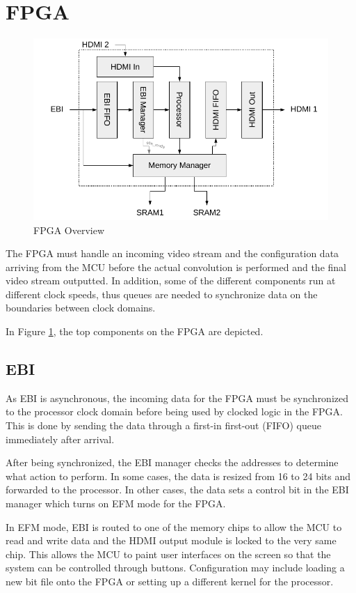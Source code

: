 \section{FPGA}
\begin{figure}
    \centering
    \includegraphics{img/FpgaOverview}
    \caption{FPGA Overview}
    \label{fig:FpgaOverview}
\end{figure}

The FPGA must handle an incoming video stream and the configuration data arriving from the MCU before the actual convolution is performed and the final video stream outputted. In addition, some of the different components run at different clock speeds, thus queues are needed to synchronize data on the boundaries between clock domains.

In Figure \ref{fig:FpgaOverview}, the top components on the FPGA are depicted.

\subsection{EBI}
As EBI is asynchronous, the incoming data for the FPGA must be synchronized to the processor clock domain before being used by clocked logic in the FPGA.
This is done by sending the data through a first-in first-out (FIFO) queue immediately after arrival.

After being synchronized, the EBI manager checks the addresses to determine what action to perform. In some cases, the data is resized from 16 to 24 bits and forwarded to the processor. In other cases, the data sets a control bit in the EBI manager which turns on EFM mode for the FPGA.

In EFM mode, EBI is routed to one of the memory chips to allow the MCU to read and write data and the HDMI output module is locked to the very same chip.
This allows the MCU to paint user interfaces on the screen so that the system can be controlled through buttons.
Configuration may include loading a new bit file onto the FPGA or setting up a different kernel for the processor.

